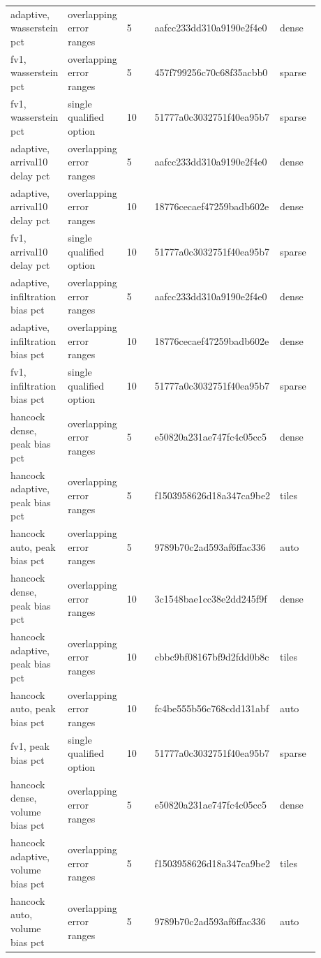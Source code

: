 \begin{longtable}{p{0.1760\linewidth}p{0.1760\linewidth}p{0.1760\linewidth}p{0.1760\linewidth}p{0.1760\linewidth}}
adaptive, wasserstein pct & overlapping error ranges & 5 & aafcc233dd310a9190e2f4e0 & dense \\
fv1, wasserstein pct & overlapping error ranges & 5 & 457f799256c70c68f35acbb0 & sparse \\
fv1, wasserstein pct & single qualified option & 10 & 51777a0c3032751f40ea95b7 & sparse \\
adaptive, arrival10 delay pct & overlapping error ranges & 5 & aafcc233dd310a9190e2f4e0 & dense \\
adaptive, arrival10 delay pct & overlapping error ranges & 10 & 18776cecaef47259badb602e & dense \\
fv1, arrival10 delay pct & single qualified option & 10 & 51777a0c3032751f40ea95b7 & sparse \\
adaptive, infiltration bias pct & overlapping error ranges & 5 & aafcc233dd310a9190e2f4e0 & dense \\
adaptive, infiltration bias pct & overlapping error ranges & 10 & 18776cecaef47259badb602e & dense \\
fv1, infiltration bias pct & single qualified option & 10 & 51777a0c3032751f40ea95b7 & sparse \\
hancock dense, peak bias pct & overlapping error ranges & 5 & e50820a231ae747fc4c05cc5 & dense \\
hancock adaptive, peak bias pct & overlapping error ranges & 5 & f1503958626d18a347ca9be2 & tiles \\
hancock auto, peak bias pct & overlapping error ranges & 5 & 9789b70c2ad593af6ffac336 & auto \\
hancock dense, peak bias pct & overlapping error ranges & 10 & 3c1548bae1cc38e2dd245f9f & dense \\
hancock adaptive, peak bias pct & overlapping error ranges & 10 & cbbc9bf08167bf9d2fdd0b8c & tiles \\
hancock auto, peak bias pct & overlapping error ranges & 10 & fc4be555b56c768cdd131abf & auto \\
fv1, peak bias pct & single qualified option & 10 & 51777a0c3032751f40ea95b7 & sparse \\
hancock dense, volume bias pct & overlapping error ranges & 5 & e50820a231ae747fc4c05cc5 & dense \\
hancock adaptive, volume bias pct & overlapping error ranges & 5 & f1503958626d18a347ca9be2 & tiles \\
hancock auto, volume bias pct & overlapping error ranges & 5 & 9789b70c2ad593af6ffac336 & auto \\

\end{longtable}

